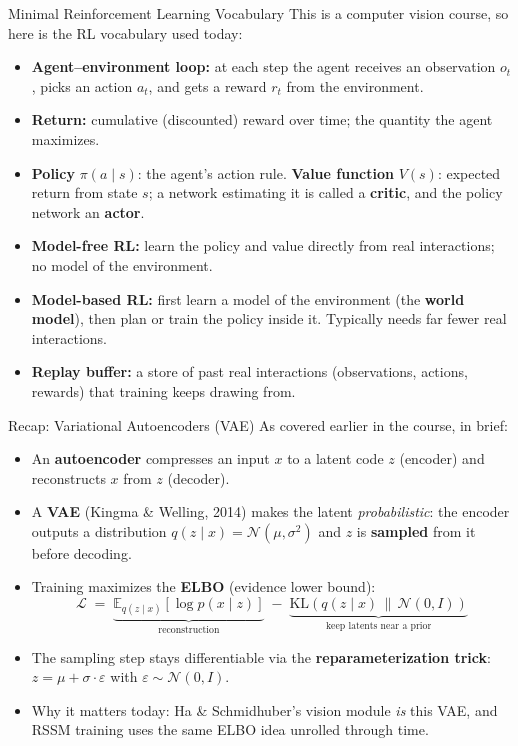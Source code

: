 \begin{frame}{Minimal Reinforcement Learning Vocabulary}
  This is a computer vision course, so here is the RL vocabulary used today:
  \begin{itemize}\itemsep0.26em
    \item \textbf{Agent--environment loop:} at each step the agent receives an observation $o_t$, picks an action $a_t$, and gets a reward $r_t$ from the environment.
    \item \textbf{Return:} cumulative (discounted) reward over time; the quantity the agent maximizes.
    \item \textbf{Policy} $\pi(a \mid s)$: the agent's action rule. \textbf{Value function} $V(s)$: expected return from state $s$; a network estimating it is called a \textbf{critic}, and the policy network an \textbf{actor}.
    \item \textbf{Model-free RL:} learn the policy and value directly from real interactions; no model of the environment.
    \item \textbf{Model-based RL:} first learn a model of the environment (the \textbf{world model}), then plan or train the policy inside it. Typically needs far fewer real interactions.
    \item \textbf{Replay buffer:} a store of past real interactions (observations, actions, rewards) that training keeps drawing from.
  \end{itemize}
\end{frame}

\begin{frame}{Recap: Variational Autoencoders (VAE)}
  As covered earlier in the course, in brief:
  \begin{itemize}\itemsep0.24em
    \item An \textbf{autoencoder} compresses an input $x$ to a latent code $z$ (encoder) and reconstructs $x$ from $z$ (decoder).
    \item A \textbf{VAE} (Kingma \& Welling, 2014) makes the latent \emph{probabilistic}: the encoder outputs a distribution $q(z \mid x) = \mathcal{N}(\mu, \sigma^2)$ and $z$ is \textbf{sampled} from it before decoding.
    \item Training maximizes the \textbf{ELBO} (evidence lower bound):
    \begin{equation*}
      \mathcal{L} \;=\; \underbrace{\mathbb{E}_{q(z \mid x)}\!\left[\log p(x \mid z)\right]}_{\text{reconstruction}} \;-\; \underbrace{\mathrm{KL}\!\left(q(z \mid x)\,\|\,\mathcal{N}(0, I)\right)}_{\text{keep latents near a prior}}
    \end{equation*}
    \item The sampling step stays differentiable via the \textbf{reparameterization trick}: $z = \mu + \sigma \cdot \varepsilon$ with $\varepsilon \sim \mathcal{N}(0, I)$.
    \item Why it matters today: Ha \& Schmidhuber's vision module \emph{is} this VAE, and RSSM training uses the same ELBO idea unrolled through time.
  \end{itemize}
\end{frame}
